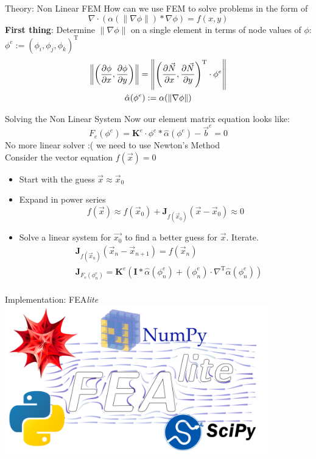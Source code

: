 \documentclass{beamer}
\newcommand\norm[1]{\left\lVert#1\right\rVert}
\begin{document}
    \begin{frame}{Theory: Non Linear FEM}
        How can we use FEM to solve problems in the form of
        \[\nabla\cdot\left(\alpha(\|\nabla\phi\|)*\nabla\phi\right)=f(x,y)\]
        \textbf{First thing}: Determine $\|\nabla\phi\|$ on a single element in terms of node values of $\phi$: $\phi^{e}:=\left( \phi_i, \phi_j, \phi_k \right)^{\text{T}}$
        \begin{gather*}
            \norm{\left(\pdv{\phi}{x},\pdv{\phi}{y}\right)}=\norm{\left(\pdv{\vec{N}}{x}, \pdv{\vec{N}}{y} \right)^{\text{T}}\cdot \phi^{e}}\\
            \hat{\alpha}(\phi^e):=\alpha(\norm{\nabla\phi})
        \end{gather*}
    \end{frame}
    \begin{frame}{Solving the Non Linear System}
        Now our element matrix equation looks like:
        \[F_e(\phi^{e})=\mathbf{K}^e\cdot \phi^e*\hat{\alpha}(\phi^{e})-\vec{b}^e=0\]
        No more linear solver :( we need to use Newton's Method\\
        \smallbreak
        Consider the vector equation $f(\vec{x})=0$
        \begin{itemize}
            \item Start with the guess $\vec{x}\approx\vec{x}_0$
            \item Expand in power series
            \[f(\vec{x})\approx f(\vec{x}_0)+\mathbf{J}_{f(\vec{x}_0)}(\vec{x}-\vec{x}_0)\approx 0\]
            \item Solve a linear system for $\vec{x_0}$ to find a better guess for $\vec{x}$.
            Iterate.
            \begin{align*}
                &\mathbf{J}_{f(\vec{x}_n)}\left(\vec{x}_{n}-\vec{x}_{n+1}\right)=f(\vec{x}_{n})\\
                &\mathbf{J}_{F_e(\phi_n^e)}=\mathbf{K}^e\left( \mathbf{I}*\hat{\alpha}(\phi_n^e)+\left(\phi_n^e\right)\cdot \nabla^{\text{T}}\hat{\alpha}(\phi_n^e) \right)\\
            \end{align*}
        \end{itemize}
    \end{frame}
    \begin{frame}{Implementation: FEA\textit{lite}}
        \hspace{-0.72cm}
        \includegraphics[width=4.5in]{technology.pdf}

    \end{frame}
\end{document}
